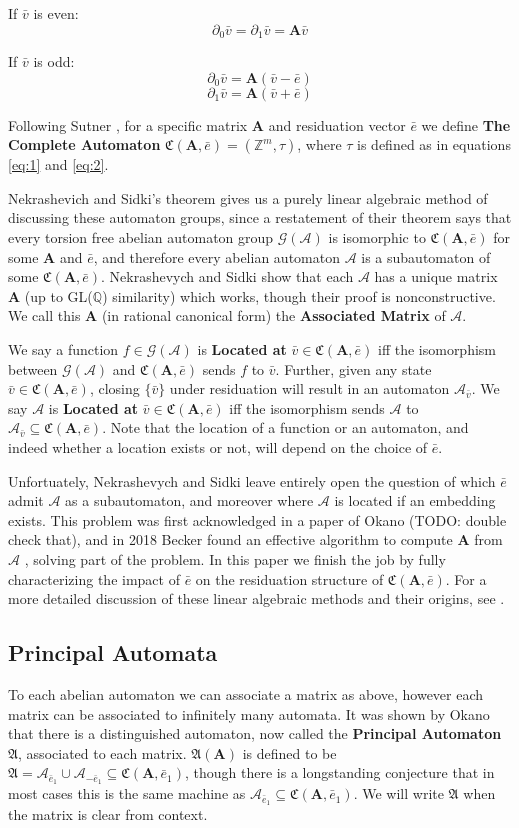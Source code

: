 \documentclass[runningheads]{llncs}
\newcommand{\A}{\mathcal{A}}
\newcommand{\G}{\mathcal{G}}
\renewcommand{\P}{\mathfrak{A}}
\newcommand{\C}{\mathfrak{C}(\Am,\e)}
\newcommand{\Z}{\mathbb{Z}}
\newcommand{\Q}{\mathbb{Q}}
\newcommand{\2}{\textbf{2}}
\newcommand{\Am}{\textbf{A}}
\newcommand{\del}{\partial}
\newcommand{\vv}{\bar{v}}
\newcommand{\e}{\bar{e}}
\begin{document}
If $\vv$ is even:
\[ \del_0 \vv = \del_1 \vv = \Am \vv \]

If $\vv$ is odd:
\[ \del_0 \vv = \Am (\vv - \e) \]
\[ \del_1 \vv = \Am (\vv + \e) \]

Following Sutner \cite{Sutner18:abelian_automata}, for a specific matrix
$\Am$ and residuation vector $\e$ we define \textbf{The Complete Automaton} 
$\C = (\Z^m, \tau)$, where $\tau$ is defined as in equations \ref{eq:1} and 
\ref{eq:2}. 

Nekrashevich and Sidki's theorem gives us a purely linear algebraic method
of discussing these automaton groups, since a restatement of their theorem 
says that every torsion free abelian automaton group $\G(\A)$ is isomorphic 
to $\C$ for some $\Am$ and $\e$, and therefore every abelian automaton $\A$
is a subautomaton of some $\C$. Nekrashevych and Sidki show that each $\A$ 
has a unique matrix $\Am$ (up to GL($\Q$) similarity) which works, though
their proof is nonconstructive. We call this $\Am$ (in rational canonical form)
the \textbf{Associated Matrix} of $\A$. 

We say a function $f \in \G(\A)$ is \textbf{Located at} $\vv \in \C$ iff the 
isomorphism between $\G(\A)$ and $\C$ sends $f$ to $\vv$. Further, given any 
state $\vv \in \C$, closing $\{ \vv \}$ under residuation will result in an
automaton $\A_{\vv}$. We say $\A$ is \textbf{Located at} $\vv \in \C$ iff the 
isomorphism sends $\A$ to $\A_{\vv} \subseteq \C$. 
Note that the location of a function or an automaton, and indeed whether a 
location exists or not, will depend on the choice of $\e$. 

Unfortuately, Nekrashevych and Sidki leave entirely open the question of 
which $\e$ admit $\A$ as a subautomaton, and moreover where $\A$ is located
if an embedding exists. This problem was first acknowledged in a paper of 
Okano \cite{Okano15} (TODO: double check that), and in 2018 Becker found an 
effective algorithm to compute $\Am$ from $\A$ \cite{Becker18}, solving
part of the problem. In this paper we finish the job by fully
characterizing the impact of $\e$ on the residuation structure of $\C$.
For a more detailed discussion of these linear algebraic methods and their 
origins, see %
\cite{Nekrashevych05:self_similar_groups,NekrashevychSidki04:automorphisms}.

\subsection{Principal Automata}
To each abelian automaton we can associate a matrix as above, however each
matrix can be associated to infinitely many automata.
It was shown by Okano \cite{Okano15:thesis} that there is a 
distinguished automaton, now called the \textbf{Principal Automaton} $\P$, 
associated to each matrix. $\P(\Am)$ is defined to be 
$\P = \A_{\e_1} \cup \A_{-\e_1} \subseteq \mathfrak{C}(\Am, \e_1)$,
though there is a longstanding conjecture that in most cases this is
the same machine as $\A_{\e_1} \subseteq \mathfrak{C}(\Am, \e_1)$.
We will write $\P$ when the matrix is clear from context. 
\end{document}
